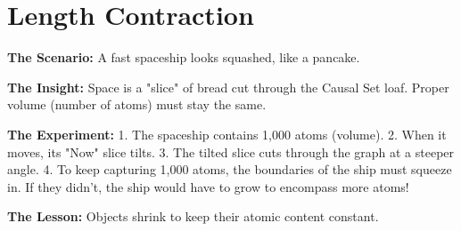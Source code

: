 \documentclass[11pt, a4paper, openany]{book}
\begin{document}
\section{Length Contraction}
\begin{thoughtexp}
\textbf{The Scenario:} A fast spaceship looks squashed, like a pancake.

\textbf{The Insight:} Space is a "slice" of bread cut through the Causal Set loaf. Proper volume (number of atoms) must stay the same.

\textbf{The Experiment:}
1. The spaceship contains 1,000 atoms (volume).
2. When it moves, its "Now" slice tilts.
3. The tilted slice cuts through the graph at a steeper angle.
4. To keep capturing 1,000 atoms, the boundaries of the ship must squeeze in. If they didn't, the ship would have to grow to encompass more atoms!

\textbf{The Lesson:} Objects shrink to keep their atomic content constant.
\end{thoughtexp}
\end{document}
